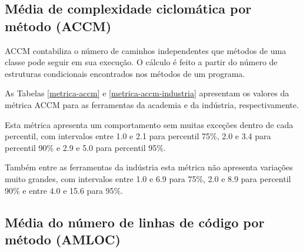 \subsection{Média de complexidade ciclomática por método (ACCM)}

ACCM contabiliza o número de caminhos independentes que métodos de uma classe
pode seguir em sua execução. O cálculo é feito a partir do número de
estruturas condicionais encontrados nos métodos de um programa.

As Tabelas \ref{metrica-accm} e \ref{metrica-accm-industria} apresentam os
valores da métrica ACCM para as ferramentas da academia e da indústria,
respectivamente.


Esta métrica apresenta um comportamento sem muitas exceções dentro de cada
percentil, com intervalos entre 1.0 e 2.1 para percentil 75\%, 2.0 e 3.4 para
percentil 90\% e 2.9 e 5.0 para percentil 95\%.


Também entre as ferramentas da indústria esta métrica não apresenta variações
muito grandes, com intervalos entre 1.0 e 6.9 para 75\%, 2.0 e 8.9 para
percentil 90\% e entre 4.0 e 15.6 para 95\%.

\subsection{Média do número de linhas de código por método (AMLOC)}

